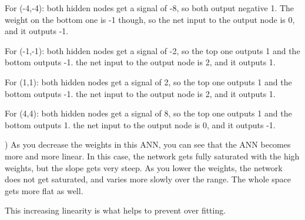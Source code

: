 \documentclass[12pt]{article}
\begin{document}
    For (-4,-4): both hidden nodes get a signal of -8, so both output negative 1. The weight on the bottom one is -1 though, 
    so the net input to the output node is 0, and it outputs -1. 
    
    For (-1,-1): both hidden nodes get a signal of -2, so the top one outputs 1 and the bottom outputs -1. 
    the net input to the output node is 2, and it outputs 1. 
    
    For (1,1): both hidden nodes get a signal of 2, so the top one outputs 1 and the bottom outputs -1. 
    the net input to the output node is 2, and it outputs 1. 
    
    For (4,4): both hidden nodes get a signal of 8, so the top one outputs 1 and the bottom outputs 1. 
    the net input to the output node is 0, and it outputs -1. 
    
) As you decrease the weights in this ANN, you can see that the ANN becomes more and more 
linear. In this case, the network gets fully saturated with the high weights, but the slope gets
very steep. As you lower the weights, the network does not get saturated, and varies more
slowly over the range. The whole space gets more flat as well. 

This increasing linearity is what helps to prevent over fitting. 
\end{document}
